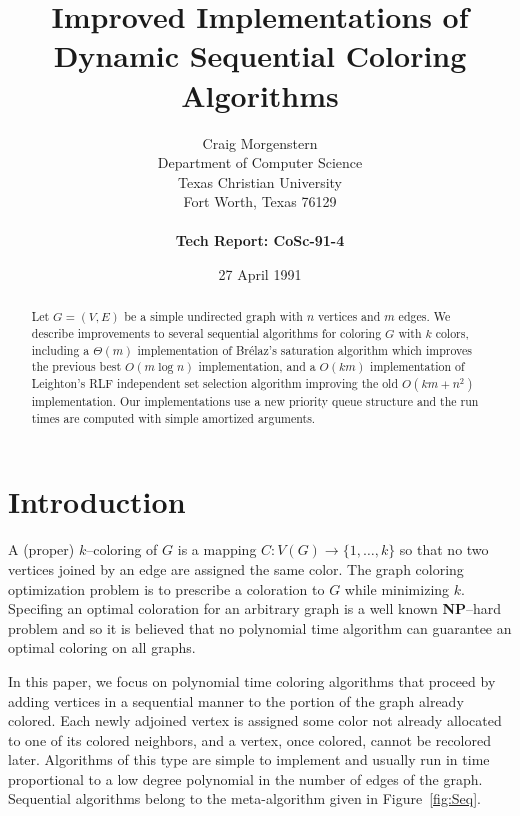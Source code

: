 

\title{Improved Implementations of Dynamic Sequential Coloring Algorithms}
\author{Craig Morgenstern \\
	Department of Computer Science \\
	Texas Christian University \\
	Fort Worth, Texas 76129 \\ \\
	{\bf Tech Report: CoSc-91-4}
	}
\date{27 April 1991}
\maketitle
\thispagestyle{empty}

\begin{abstract}
Let $G=(V,E)$ be a simple undirected graph with $n$ vertices and $m$ 
edges.  We describe improvements to several sequential
algorithms for coloring $G$ with $k$ colors, including
a $\Theta (m)$ implementation of Br\'{e}laz's
saturation algorithm which improves the previous best 
$O(m \log n)$ implementation, and a $O(km)$ implementation
of Leighton's RLF independent set selection algorithm improving the
old $O(km + n^2)$ implementation.  Our implementations use 
a new priority queue structure and the run times are computed with
simple amortized arguments.
\end{abstract}

\addtolength{\baselineskip}{12pt}   %

\section{Introduction}
A (proper) $k$--coloring of $G$ is a mapping 
$C: V(G) \rightarrow  \{1, \ldots, k\}$ 
so that no two vertices joined by an edge are assigned the same color.  The
graph coloring optimization problem is to prescribe a coloration to 
$G$ while minimizing $k$.
Specifing an optimal coloration for an arbitrary graph is a well known
{\bf NP}--hard problem and so it is believed that no polynomial time
algorithm can guarantee an optimal coloring on all graphs.  

In this paper, we focus on polynomial time coloring algorithms 
that proceed by 
adding vertices in a sequential manner to the portion of the graph already 
colored.
Each newly adjoined vertex is assigned some color not already allocated
to one of its colored neighbors, and a vertex, once colored, cannot be 
recolored later. Algorithms of this
type are simple to implement and usually run in time proportional to a low
degree polynomial in the number of edges of the graph.  Sequential algorithms 
belong to the meta-algorithm given in Figure~\ref{fig:Seq}. 

